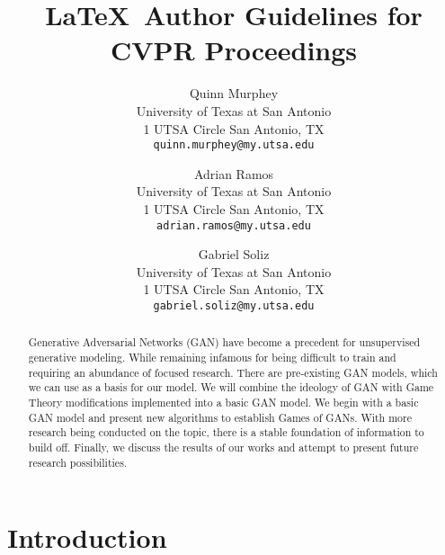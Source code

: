 \documentclass[final]{cvpr}
\begin{document}
\title{\LaTeX\ Author Guidelines for CVPR Proceedings}

\author{Quinn Murphey\\
University of Texas at San Antonio\\
1 UTSA Circle San Antonio, TX\\
{\tt\small quinn.murphey@my.utsa.edu}
\and
Adrian Ramos\\
University of Texas at San Antonio\\
1 UTSA Circle San Antonio, TX\\
{\tt\small adrian.ramos@my.utsa.edu}

\and
Gabriel Soliz\\
University of Texas at San Antonio\\
1 UTSA Circle San Antonio, TX\\
{\tt\small gabriel.soliz@my.utsa.edu}
}

\maketitle


\begin{abstract}
    Generative Adversarial Networks (GAN) have become a precedent for
    unsupervised generative modeling. While remaining infamous for being
    difficult to train and requiring an abundance of focused research. There are
    pre-existing GAN models, which we can use as a basis for our model. We will
    combine the ideology of GAN with Game Theory modifications implemented into
    a basic GAN model. We begin with a basic GAN model and present new
    algorithms to establish Games of GANs. With more research being conducted on
    the topic, there is a stable foundation of information to build off.
    Finally, we discuss the results of our works and attempt to present future
    research possibilities.
\end{abstract}


\section{Introduction}
\end{document}
